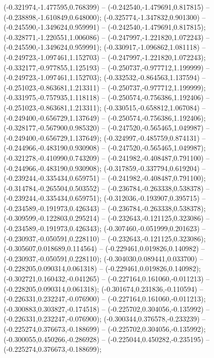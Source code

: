  (-0.321974,-1.477595,0.768399) -- (-0.242540,-1.479691,0.817815) -- (-0.238898,-1.610849,0.648000);
 (-0.325774,-1.347832,0.901300) -- (-0.245590,-1.349624,0.959991) -- (-0.242540,-1.479691,0.817815);
 (-0.328771,-1.220551,1.006086) -- (-0.247997,-1.221820,1.072243) -- (-0.245590,-1.349624,0.959991);
 (-0.330917,-1.096862,1.081118) -- (-0.249723,-1.097461,1.152703) -- (-0.247997,-1.221820,1.072243);
 (-0.332177,-0.977855,1.125193) -- (-0.250737,-0.977712,1.199999) -- (-0.249723,-1.097461,1.152703);
 (-0.332532,-0.864563,1.137594) -- (-0.251023,-0.863681,1.213311) -- (-0.250737,-0.977712,1.199999);
 (-0.331975,-0.757935,1.118118) -- (-0.250574,-0.756386,1.192406) -- (-0.251023,-0.863681,1.213311);
 (-0.330515,-0.658812,1.067084) -- (-0.249400,-0.656729,1.137649) -- (-0.250574,-0.756386,1.192406);
 (-0.328177,-0.567900,0.985320) -- (-0.247520,-0.565465,1.049987) -- (-0.249400,-0.656729,1.137649);
 (-0.324997,-0.485759,0.874131) -- (-0.244966,-0.483190,0.930908) -- (-0.247520,-0.565465,1.049987);
 (-0.321278,-0.410990,0.743209) -- (-0.241982,-0.408487,0.791100) -- (-0.244966,-0.483190,0.930908);
 (-0.317859,-0.337794,0.619204) -- (-0.239244,-0.335434,0.659751) -- (-0.241982,-0.408487,0.791100);
 (-0.314784,-0.265504,0.503552) -- (-0.236784,-0.263338,0.538378) -- (-0.239244,-0.335434,0.659751);
 (-0.312036,-0.193907,0.395715) -- (-0.234589,-0.191973,0.426343) -- (-0.236784,-0.263338,0.538378);
 (-0.309599,-0.122803,0.295214) -- (-0.232643,-0.121125,0.323086) -- (-0.234589,-0.191973,0.426343);
 (-0.307460,-0.051999,0.201623) -- (-0.230937,-0.050591,0.228110) -- (-0.232643,-0.121125,0.323086);
 (-0.305607,0.018689,0.114564) -- (-0.229461,0.019826,0.140982) -- (-0.230937,-0.050591,0.228110);
 (-0.304030,0.089441,0.033700) -- (-0.228205,0.090314,0.061318) -- (-0.229461,0.019826,0.140982);
 (-0.302721,0.160432,-0.041265) -- (-0.227164,0.161060,-0.011213) -- (-0.228205,0.090314,0.061318);
 (-0.301674,0.231836,-0.110594) -- (-0.226331,0.232247,-0.076900) -- (-0.227164,0.161060,-0.011213);
 (-0.300883,0.303827,-0.174518) -- (-0.225702,0.304056,-0.135992) -- (-0.226331,0.232247,-0.076900);
 (-0.300344,0.376578,-0.233239) -- (-0.225274,0.376673,-0.188699) -- (-0.225702,0.304056,-0.135992);
 (-0.300055,0.450266,-0.286928) -- (-0.225044,0.450282,-0.235195) -- (-0.225274,0.376673,-0.188699);
